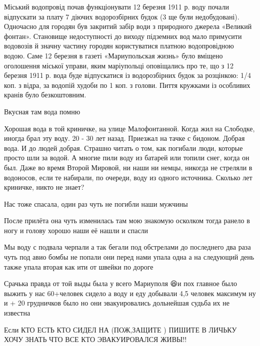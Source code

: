 Міський водопровід почав функціонувати 12 березня 1911 р. воду почали
відпускати за плату 7 діючих водорозбірних будок (3 ще були недобудовані).
Одночасно для городян був закритий забір води з природного джерела «Великий
фонтан». Становище недоступності до виходу підземних вод мало примусити
водовозів й значну частину городян користуватися платною водопровідною водою.
Саме 12 березня в газеті «Мариупольская жизнь» було вміщено оголошення міської
управи, яким маріупольці оповіщались про те, що з 12 березня 1911 р. вода буде
відпускатися із водорозбірних будок за розцінкою: 1/4 коп. з відра, за водопій
худоби по 1 коп. з голови. Пиття кружками із особливих кранів було
безкоштовним.


Вкусная там вода помню


Хорошая вода в той криничке, на улице Малофонтанной. Когда жил на Слободке,
иногда брал эту воду. 20 - 30 лет назад. Приезжал на тачке с бидоном. Добрая
вода. И до людей добрая. Страшно читать о том, как погибали люди, которые
просто шли за водой. А многие пили воду из батарей или топили снег, когда он
был. Даже во время Второй Мировой, ни наши ни немцы, никогда не стреляли в
водоносов, если те набирали, по очереди, воду из одного источника. Сколько лет
криничке, никто не знает?


Нас тоже спасала, один раз чуть не погибли наши мужчины


После прилёта она чуть изменилась там мою знакомую осколком тогда ранело в ногу
и голову хорошо наши её нашли и спасли


Мы воду с подвала черпали а так бегали под обстрелами до последнего два раза
чуть под авио бомбы не попали они перед нами упала одна а на следующий день
также упала вторая как ити от швейки по дороге


Срачька правда от той выды была у всего Мариуполя 😆и пох главное было выжить у
нас 60+человек сидело а воду и еду добывали 4,5 человек максимум ну и + 20
грудничков было но они эвакуировались дольнейшая судьба их не известна


Если КТО ЕСТЬ КТО СИДЕЛ НА (ПОЖ,ЗАЩИТЕ ) ПИШИТЕ В ЛИЧЬКУ ХОЧУ ЗНАТЬ ЧТО ВСЕ КТО ЭВАКУИРОВАЛСЯ ЖИВЫ!!
